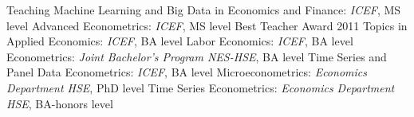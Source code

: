 
\def\arraystretch{1.3}

\begin{rubric}{Teaching}
\entry*[Fall 2019--26] Machine Learning and Big Data in Economics and Finance: \emph{ICEF}, MS level \newline
\entry*[Fall 2010--26] Advanced Econometrics: \emph{ICEF}, MS level \newline
                        Best Teacher Award 2011
\entry*[Fall 2016--18] Topics in Applied Economics: \emph{ICEF}, BA level \newline
\entry*[Fall 2015] Labor Economics: \emph{ICEF}, BA level \newline
\entry*[Fall 2013--14] Econometrics: \emph{Joint Bachelor's Program NES-HSE}, BA level \newline
\entry*[Fall 2009] Time Series and Panel Data Econometrics: \emph{ICEF}, BA level
\entry*[Spring 2010--12]  Microeconometrics: \emph{Economics Department HSE}, PhD level
\entry*[Fall 2009]  Time Series Econometrics: \emph{Economics Department HSE}, BA-honors level
\end{rubric}

